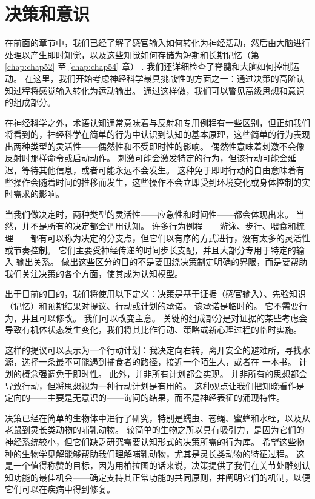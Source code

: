 \chapter{决策和意识} \label{chap:chap56}
在前面的章节中，我们已经了解了感官输入如何转化为神经活动，然后由大脑进行处理以产生即时知觉，以及这些知觉如何存储为短期和长期记忆（第 \ref{chap:chap52} 至 \ref{chap:chap54} 章） . 我们还详细检查了脊髓和大脑如何控制运动。 在这里，我们开始考虑神经科学最具挑战性的方面之一：通过决策的高阶认知过程将感觉输入转化为运动输出。 通过这样做，我们可以瞥见高级思想和意识的组成部分。

在神经科学之外，术语认知通常意味着与反射和专用例程有一些区别，但正如我们将看到的，神经科学在简单的行为中认识到认知的基本原理，这些简单的行为表现出两种类型的灵活性——偶然性和不受即时性的影响。 偶然性意味着刺激不会像反射时那样命令或启动动作。 刺激可能会激发特定的行为，但该行动可能会延迟，等待其他信息，或者可能永远不会发生。 这种免于即时行动的自由意味着有些操作会随着时间的推移而发生，这些操作不会立即受到环境变化或身体控制的实时需求的影响。

当我们做决定时，两种类型的灵活性——应急性和时间性——都会体现出来。 当然，并不是所有的决定都会调用认知。 许多行为例程——游泳、步行、喂食和梳理——都有可以称为决定的分支点，但它们以有序的方式进行，没有太多的灵活性或节奏控制。 它们主要受神经传递的时间步长支配，并且大部分专用于特定的输入-输出关系。 做出这些区分的目的不是要围绕决策制定明确的界限，而是要帮助我们关注决策的各个方面，使其成为认知模型。

出于目前的目的，我们将使用以下定义：决策是基于证据（感官输入）、先验知识（记忆）和预期结果对提议、行动或计划的承诺。 该承诺是临时的。 它不需要行为，并且可以修改。 我们可以改变主意。 关键的组成部分是对证据的某些考虑会导致有机体状态发生变化，我们将其比作行动、策略或新心理过程的临时实施。

这样的提议可以表示为一个行动计划：我决定向右转，离开安全的避难所，寻找水源，选择一条最不可能遇到捕食者的路径，接近一个陌生人，或者在 一本书。 计划的概念强调免于即时性。 此外，并非所有计划都会实现。 并非所有的思想都会导致行动，但将思想视为一种行动计划是有用的。 这种观点让我们把知晓看作是定向的——主要是无意识的——询问的结果，而不是神经表征的涌现特性。

决策已经在简单的生物体中进行了研究，特别是蠕虫、苍蝇、蜜蜂和水蛭，以及从老鼠到灵长类动物的哺乳动物。 较简单的生物之所以具有吸引力，是因为它们的神经系统较小，但它们缺乏研究需要认知形式的决策所需的行为库。 希望这些物种的生物学见解能够帮助我们理解哺乳动物，尤其是灵长类动物的特征过程。 这是一个值得称赞的目标，因为用柏拉图的话来说，决策提供了我们在关节处雕刻认知功能的最佳机会——确定支持其正常功能的共同原则，并阐明它们的机制，以便它们可以在疾病中得到修复。

